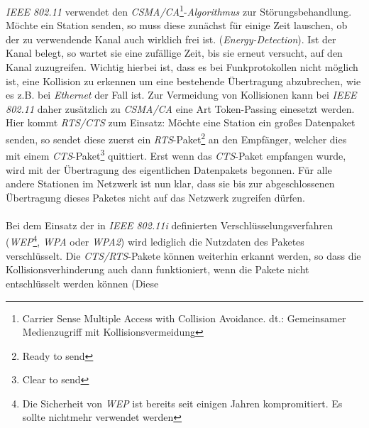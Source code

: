             \emph{IEEE 802.11} verwendet den \emph{CSMA/CA}\footnote{Carrier Sense Multiple Access with 
            Collision Avoidance. dt.: Gemeinsamer Medienzugriff mit Kollisionsvermeidung}-\emph{Algorithmus}
            zur Störungsbehandlung. Möchte ein Station senden, so muss diese zunächst
            für einige Zeit lauschen, ob der zu verwendende Kanal auch wirklich frei ist.
            (\emph{Energy-Detection}).
            Ist der Kanal belegt, so wartet sie eine zufällige Zeit, bis sie erneut versucht,
            auf den Kanal zuzugreifen. Wichtig hierbei ist, dass es bei Funkprotokollen nicht
            möglich ist, eine Kollision zu erkennen um eine bestehende Übertragung abzubrechen,
            wie es z.B. bei \textsl{Ethernet} der Fall ist. Zur Vermeidung von Kollisionen
            kann bei \emph{IEEE 802.11} daher zusätzlich zu \emph{CSMA/CA} eine Art Token-Passing einesetzt
            werden. Hier kommt \emph{RTS/CTS} zum Einsatz: Möchte eine Station ein großes Datenpaket
            senden, so sendet diese zuerst ein \emph{RTS}-Paket\footnote{Ready to send} an den Empfänger, 
            welcher dies mit einem \emph{CTS}-Paket\footnote{Clear to send} quittiert. Erst wenn das
            \emph{CTS}-Paket empfangen wurde, wird mit der Übertragung des eigentlichen Datenpakets
            begonnen. Für alle andere Stationen im Netzwerk ist nun klar, dass sie bis zur
            abgeschlossenen Übertragung dieses Paketes nicht auf das Netzwerk zugreifen
            dürfen.\\
            \\
            Bei dem Einsatz der in \emph{IEEE 802.11i} definierten Verschlüsselungsverfahren
            (\emph{WEP}\footnote{Die Sicherheit von \emph{WEP} ist bereits seit einigen Jahren
             kompromitiert. Es sollte nichtmehr verwendet werden}, \emph{WPA} oder \emph{WPA2}) wird
            lediglich die Nutzdaten des Paketes verschlüsselt. Die \emph{CTS/RTS}-Pakete können
            weiterhin erkannt werden, so dass die Kollisionsverhinderung auch dann
            funktioniert, wenn die Pakete nicht entschlüsselt werden können (Diese 
